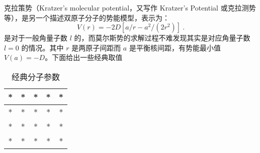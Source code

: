 
克拉策势（Kratzer's molecular potential，又写作 Kratzer's Potential 或克拉测势等），是另一个描述双原子分子的势能模型，表示为：
\begin{equation}
V(r) = -2D [a/r - a^2/(2r^2)] ~.
\end{equation}
是对于一般角量子数 $l$ 的，而莫尔斯势的求解过程不难发现其实是对应角量子数 $l=0$ 的情况。其中 $r$ 是两原子间距而 $a$ 是平衡核间距，有势能最小值 $V(a) = -D$。下面给出一些经典取值
\begin{table}[ht]
\centering
\caption{经典分子参数}\label{tab_kratPo1}
\begin{tabular}{|c|c|c|c|c|}
\hline
* & * & * & * & *\\
\hline
* & * & * & * & *\\
\hline
* & * & * & * & *\\
\hline
* & * & * & * & * \\
\hline
\end{tabular}
\end{table}